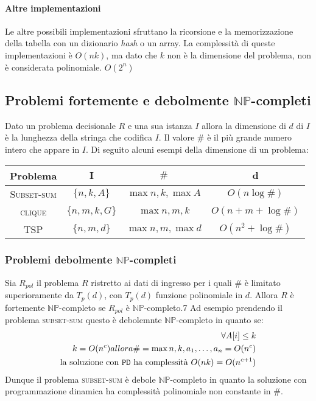             \paragraph{Altre implementazioni}
                Le altre possibili implementazioni sfruttano la ricorsione e la memorizzazione della tabella con un dizionario \textit{hash} o un array. La complessità di queste implementazioni è $O(nk)$, ma dato che $k$ non è la dimensione del problema, non è considerata polinomiale. $O(2^n)$
    \subsection{Problemi fortemente e debolmente \texorpdfstring{$\mathbb{NP}$}{NP}-completi}
            Dato un problema decisionale $R$ e una sua istanza $I$ allora la dimensione di $d$ di $I$ è la lunghezza della stringa che codifica $I$. Il valore $\#$ è il più grande numero intero che appare in $I$.\newline
            Di seguito alcuni esempi della dimensione di un problema:
            \begin{table}[H]
                \centering
                \begin{tabular}{|c|c|c|c|}
                    \hline
                    \textbf{Problema} & $\textbf{I}$ & $\textbf{\#}$ & $\textbf{d}$ \\ \hline
                    \textsc{Subset-sum} & $\{n,k,A\}$ & $\max{n,k,\max{A}}$ & $O(n\log \#)$ \\ \hline
                    \textsc{clique} & $\{n,m,k,G\}$ & $\max{n,m,k}$ & $O(n+m+\log \#)$ \\ \hline
                    \textsc{TSP} & $\{n,m,d\}$ & $\max{n,m,\max d}$ & $O(n^2+\log \#)$ \\ \hline
                \end{tabular}
            \end{table}
        \subsubsection{Problemi debolmente \texorpdfstring{$\mathbb{NP}$}{NP}-completi}
            Sia $R_{pol}$ il problema $R$ ristretto ai dati di ingresso per i quali $\#$ è limitato superioramente da $T_p(d)$, con $T_p(d)$ funzione polinomiale in $d$. Allora $R$ è fortemente $\mathbb{NP}$-completo se $R_{pol}$ è $\mathbb{NP}$-completo.7
            \newline
            Ad esempio prendendo il problema \textsc{subset-sum} questo è debolemnte $\mathbb{NP}$-completo in quanto se:
            \begin{align*}
                \forall A[i] \leq k\\
                k=O(n^c) allora \#=\max{n,k,a_1,\ldots,a_n} = O(n^c)\\
                \text{la soluzione con \texttt{PD} ha complessità } O(nk) = O(n^{c+1})                
            \end{align*}
            Dunque il problema \textsc{subset-sum} è debole $\mathbb{NP}$-completo in quanto la soluzione con programmazione dinamica ha complessità polinomiale non constante in $\#$.
